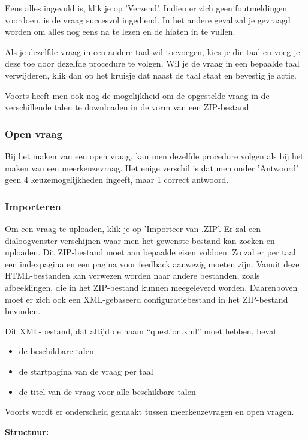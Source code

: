 \documentclass[]{article}
\begin{document}
Eens alles ingevuld is, klik je op 'Verzend'. Indien er zich geen foutmeldingen voordoen, is de vraag succesvol ingediend. In het andere geval zal je gevraagd worden om alles nog eens na te lezen en de hiaten in te vullen.

Als je dezelfde vraag in een andere taal wil toevoegen, kies je die taal en voeg je deze toe door dezelfde procedure te volgen. Wil je de vraag in een bepaalde taal verwijderen, klik dan op het kruisje dat naast de taal staat en bevestig je actie. 

Voorts heeft men ook nog de mogelijkheid om de opgestelde vraag in de verschillende talen te downloaden in de vorm van een ZIP-bestand. 

\subsubsection{Open vraag}

Bij het maken van een open vraag, kan men dezelfde procedure volgen als bij het maken van een meerkeuzevraag. Het enige verschil is dat men onder 'Antwoord' geen 4 keuzemogelijkheden ingeeft, maar 1 correct antwoord.

\subsubsection{Importeren}
Om een vraag te uploaden, klik je op 'Importeer van .ZIP'. Er zal een dialoogvenster verschijnen waar men het gewenste bestand kan zoeken en uploaden. Dit ZIP-bestand moet aan bepaalde eisen voldoen. Zo zal er per taal een indexpagina en een pagina voor feedback aanwezig moeten zijn. Vanuit deze HTML-bestanden kan verwezen worden naar andere bestanden, zoals afbeeldingen, die in het ZIP-bestand kunnen meegeleverd worden. Daarenboven moet er zich ook een XML-gebaseerd configuratiebestand in het ZIP-bestand bevinden. 

Dit XML-bestand, dat altijd de naam "`question.xml"' moet hebben, bevat
\begin{itemize}
\item de beschikbare talen
\item de startpagina van de vraag per taal
\item de titel van de vraag voor alle beschikbare talen
\end{itemize}

Voorts wordt er onderscheid gemaakt tussen meerkeuzevragen en open vragen.

\textbf{Structuur:}
\end{document}
